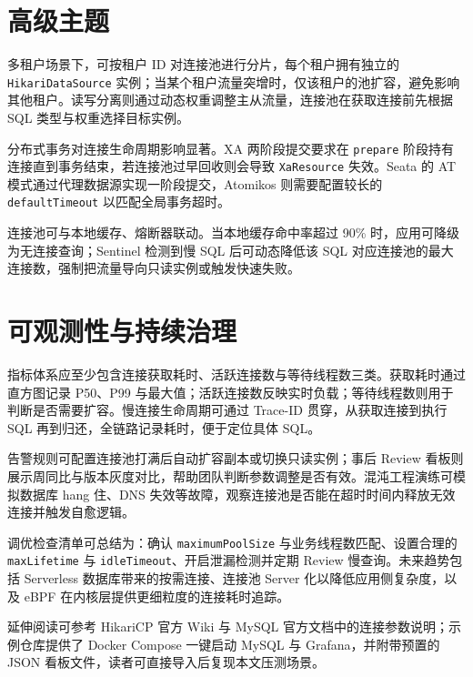 \chapter{高级主题}
多租户场景下，可按租户 ID 对连接池进行分片，每个租户拥有独立的 \texttt{HikariDataSource} 实例；当某个租户流量突增时，仅该租户的池扩容，避免影响其他租户。读写分离则通过动态权重调整主从流量，连接池在获取连接前先根据 SQL 类型与权重选择目标实例。\par
分布式事务对连接生命周期影响显著。XA 两阶段提交要求在 \texttt{prepare} 阶段持有连接直到事务结束，若连接池过早回收则会导致 \texttt{XaResource} 失效。Seata 的 AT 模式通过代理数据源实现一阶段提交，Atomikos 则需要配置较长的 \texttt{defaultTimeout} 以匹配全局事务超时。\par
连接池可与本地缓存、熔断器联动。当本地缓存命中率超过 90\%{} 时，应用可降级为无连接查询；Sentinel 检测到慢 SQL 后可动态降低该 SQL 对应连接池的最大连接数，强制把流量导向只读实例或触发快速失败。\par
\chapter{可观测性与持续治理}
指标体系应至少包含连接获取耗时、活跃连接数与等待线程数三类。获取耗时通过直方图记录 P50、P99 与最大值；活跃连接数反映实时负载；等待线程数则用于判断是否需要扩容。慢连接生命周期可通过 Trace-ID 贯穿，从获取连接到执行 SQL 再到归还，全链路记录耗时，便于定位具体 SQL。\par
告警规则可配置连接池打满后自动扩容副本或切换只读实例；事后 Review 看板则展示周同比与版本灰度对比，帮助团队判断参数调整是否有效。混沌工程演练可模拟数据库 hang 住、DNS 失效等故障，观察连接池是否能在超时时间内释放无效连接并触发自愈逻辑。\par
调优检查清单可总结为：确认 \texttt{maximumPoolSize} 与业务线程数匹配、设置合理的 \texttt{maxLifetime} 与 \texttt{idleTimeout}、开启泄漏检测并定期 Review 慢查询。未来趋势包括 Serverless 数据库带来的按需连接、连接池 Server 化以降低应用侧复杂度，以及 eBPF 在内核层提供更细粒度的连接耗时追踪。\par
延伸阅读可参考 HikariCP 官方 Wiki 与 MySQL 官方文档中的连接参数说明；示例仓库提供了 Docker Compose 一键启动 MySQL 与 Grafana，并附带预置的 JSON 看板文件，读者可直接导入后复现本文压测场景。\par
